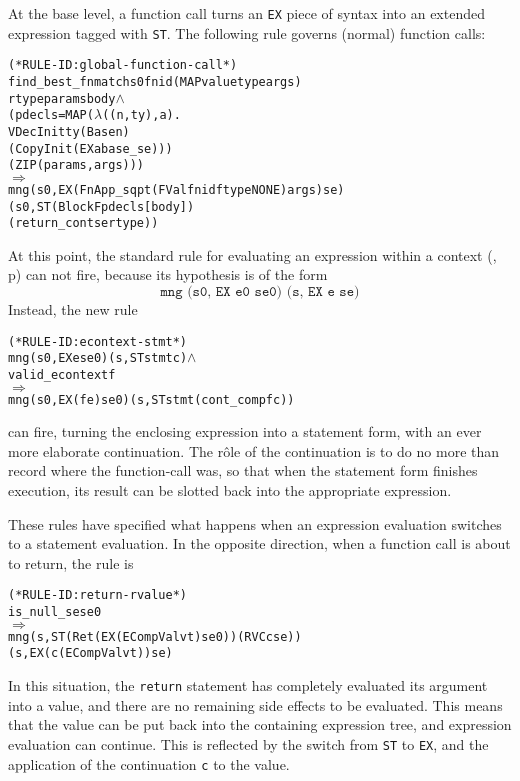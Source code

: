 \documentclass[11pt]{article}
\begin{document}
At the base level, a function call turns an \texttt{EX} piece of
syntax into an extended expression tagged with \texttt{ST}.  
The following rule governs (normal) function calls: 
\begin{alltt}
(* RULE-ID: global-function-call *)
     find_best_fnmatch s0 fnid (MAP valuetype args) 
                       rtype params body \(\land\)
     (pdecls = MAP (\(\lambda\)((n,ty),a). 
                       VDecInit ty (Base n)
                                   (CopyInit (EX a base_se)))
                   (ZIP (params, args)))
   \(\Rightarrow\)
     mng (s0, EX (FnApp_sqpt (FVal fnid ftype NONE) args) se) 
         (s0, ST (Block F pdecls [body]) 
                 (return_cont se rtype))
\end{alltt}
At this point, the standard rule for evaluating an expression within a
context (, p\pageref{rule:econtext-expr}) can
not fire, because its hypothesis is of the form 
\[
\texttt{mng (s0, EX e0 se0) (s, EX e se)}
\]
Instead, the new rule 
\label{rule:econtext-stmt}
\begin{alltt}
(* RULE-ID: econtext-stmt *)
     mng (s0, EX e se0) (s, ST stmt c) \(\land\)
     valid_econtext f
   \(\Rightarrow\)
     mng (s0, EX (f e) se0) (s, ST stmt (cont_comp f c))
\end{alltt}
can fire, turning the enclosing expression into a statement form, with
an ever more elaborate continuation.   The r\^ole of the continuation
is to do no more than record where the function-call was, so that when
the statement form finishes execution, its result can be slotted back
into the appropriate expression.

These rules have specified what happens when an expression evaluation
switches to a statement evaluation.  In the opposite direction, when a
function call is about to return, the rule is
\begin{alltt}
(* RULE-ID: return-rvalue *)
     is_null_se se0
   \(\Rightarrow\)
     mng (s, ST (Ret (EX (ECompVal v t) se0)) (RVC c se)) 
         (s, EX (c (ECompVal v t)) se)
\end{alltt}
In this situation, the \texttt{return} statement has completely
evaluated its argument into a value, and there are no remaining side
effects to be evaluated.  This means that the value can be put back
into the containing expression tree, and expression evaluation can
continue.  This is reflected by the switch from \texttt{ST} to
\texttt{EX}, and the application of the continuation \texttt{c} to the
value.  
\end{document}
